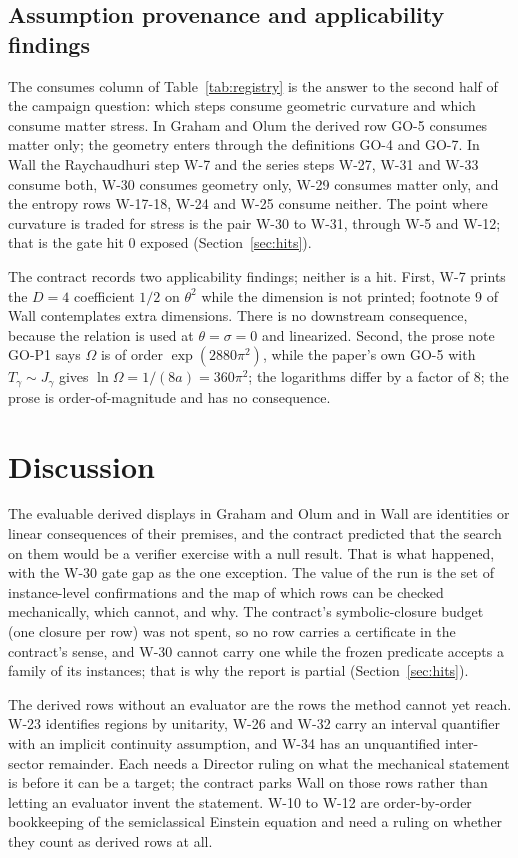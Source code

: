 \documentclass[11pt]{article}
\begin{document}
\subsection{Assumption provenance and applicability findings}

The consumes column of Table~\ref{tab:registry} is the answer to the second half of the campaign question: which steps consume geometric curvature and which consume matter stress. In Graham and Olum the derived row GO-5 consumes matter only; the geometry enters through the definitions GO-4 and GO-7. In Wall the Raychaudhuri step W-7 and the series steps W-27, W-31 and W-33 consume both, W-30 consumes geometry only, W-29 consumes matter only, and the entropy rows W-17-18, W-24 and W-25 consume neither. The point where curvature is traded for stress is the pair W-30 to W-31, through W-5 and W-12; that is the gate hit 0 exposed (Section~\ref{sec:hits}).

The contract records two applicability findings; neither is a hit. First, W-7 prints the $D = 4$ coefficient $1/2$ on $\theta^2$ while the dimension is not printed; footnote 9 of Wall contemplates extra dimensions. There is no downstream consequence, because the relation is used at $\theta = \sigma = 0$ and linearized. Second, the prose note GO-P1 says $\Omega$ is of order $\exp(2880\pi^2)$, while the paper's own GO-5 with $T_\gamma \sim J_\gamma$ gives $\ln\Omega = 1/(8a) = 360\pi^2$; the logarithms differ by a factor of $8$; the prose is order-of-magnitude and has no consequence.

\section{Discussion}

The evaluable derived displays in Graham and Olum and in Wall are identities or linear consequences of their premises, and the contract predicted that the search on them would be a verifier exercise with a null result. That is what happened, with the W-30 gate gap as the one exception. The value of the run is the set of instance-level confirmations and the map of which rows can be checked mechanically, which cannot, and why. The contract's symbolic-closure budget (one closure per row) was not spent, so no row carries a certificate in the contract's sense, and W-30 cannot carry one while the frozen predicate accepts a family of its instances; that is why the report is partial (Section~\ref{sec:hits}).

The derived rows without an evaluator are the rows the method cannot yet reach. W-23 identifies regions by unitarity, W-26 and W-32 carry an interval quantifier with an implicit continuity assumption, and W-34 has an unquantified inter-sector remainder. Each needs a Director ruling on what the mechanical statement is before it can be a target; the contract parks Wall on those rows rather than letting an evaluator invent the statement. W-10 to W-12 are order-by-order bookkeeping of the semiclassical Einstein equation and need a ruling on whether they count as derived rows at all.
\end{document}
